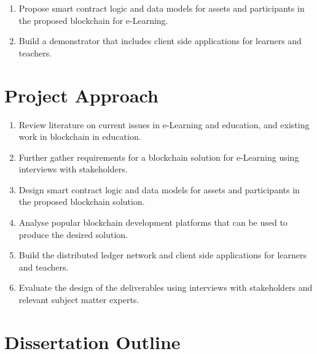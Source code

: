 \begin{enumerate}
    \item Propose smart contract logic and data models for assets and participants in the proposed blockchain for e-Learning.
    \item Build a demonstrator that includes client side applications for learners and teachers.
\end{enumerate}



\section{Project Approach} %

\begin{enumerate}
    \item Review literature on current issues in e-Learning and education, and existing work in blockchain in education.
    \item Further gather requirements for a blockchain solution for e-Learning using interviews with stakeholders.
    \item Design smart contract logic and data models for assets and participants in the proposed blockchain solution.
    \item Analyse popular blockchain development platforms that can be used to produce the desired solution.
    \item Build the distributed ledger network and client side applications for learners and teachers.
    \item Evaluate the design of the deliverables using interviews with stakeholders and relevant subject matter experts.
\end{enumerate}

\section{Dissertation Outline}  %

